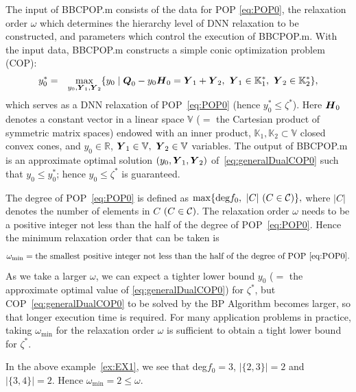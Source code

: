 \documentclass[12pt]{article}
\def\H{\mbox{\boldmath $H$}}
\def\Q{\mbox{\boldmath $Q$}}
\def\Y{\mbox{\boldmath $Y$}}
\def\CC{\mbox{$\cal C$}}
\def\inprod#1#2{\langle#1, \, #2\rangle}
\def\Real{\mbox{$\mathbb{R}$}}
\def\Real{\mathbb{R}}
\def\coneK{\mathbb{K}}
\def\spaceV{\mathbb{V}}
\def\matBP{BBCPOP}
\begin{document}
The input of \matBP.m consists of the data for POP \eqref{eq:POP0}, the relaxation order $\omega$ which determines 
the hierarchy level of DNN relaxation to be constructed, and parameters which control the execution of 
\matBP.m. With the input data, \matBP.m constructs a simple conic optimization problem (COP):
\begin{eqnarray}
  y_0^* & = &  \max_{\scriptsize y_0,\Y_1, \Y_2}\{y_0 \mid  \Q_0 - y_0 \H_0 = \Y_1+ \Y_2, \ \Y_1 \in \coneK_1^*, 
\ \Y_2 \in \coneK_2^*\}
\label{eq:generalDualCOP0}, %
\end{eqnarray}
which serves as a DNN relaxation of POP~\eqref{eq:POP0} (hence $y_0^* \leq \zeta^*$). Here $\H_0$ denotes 
a constant vector in a linear space $\spaceV$ ($=$ the Cartesian product of symmetric matrix spaces) 
endowed with an inner product, %
$\coneK_1, \coneK_2 \subset \spaceV$ closed convex cones, and $y_0 \in\Real$, $\Y_1 \in \spaceV, \ \Y_2 \in \spaceV$ 
variables. The output of  \matBP.m is
 an approximate optimal solution $(y_0,\Y_1,\Y_2)$ of~\eqref{eq:generalDualCOP0} such that 
$y_0 \leq y_0^*$; hence $y_0 \leq \zeta^*$ is guaranteed. 

The degree of POP~\eqref{eq:POP0}  is defined as 
$ %
\max\{ \mbox{deg}f_0, \ |C| \ (C \in \CC) \}, 
$ %
where $|C|$ denotes the number of elements in $C$ $(C \in \CC)$. 
The relaxation order $\omega$ needs to be a positive integer not less than 
the half of the degree of POP~\eqref{eq:POP0}. %
Hence the minimum relaxation order that can be taken is  %
\begin{eqnarray*}
\omega_{\min} = \mbox{the smallest positive integer not less than the half of the degree of POP~\eqref{eq:POP0}}. 
\end{eqnarray*} 
As we take a larger $\omega$, we can expect a tighter lower bound 
$y_0$ ($=$ the approximate optimal value of \eqref{eq:generalDualCOP0})  for $\zeta^*$, but 
COP~\eqref{eq:generalDualCOP0} to be solved by the BP Algorithm becomes larger, so that 
longer execution time is required. 
For many application problems in practice, taking $\omega_{\min}$ for the relaxation order $\omega$ is sufficient 
to obtain a tight lower bound for $\zeta^*$. 

In the above example~\eqref{ex:EX1}, we see that deg$f_0 = 3$, $|\{2,3\}| = 2$ and $|\{3,4\}| = 2$. 
Hence $\omega_{\min}= 2 \leq \omega$. 
\end{document}
